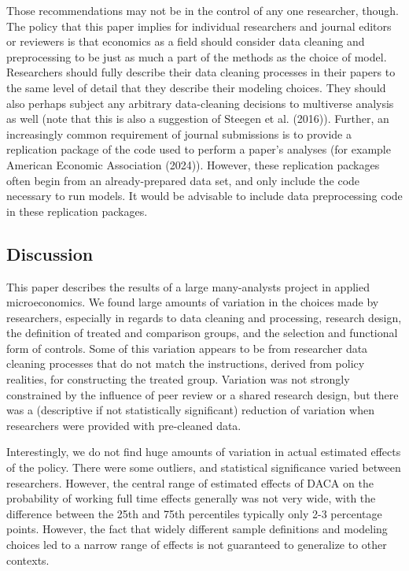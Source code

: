 \documentclass[
  letterpaper,
  DIV=11,
  numbers=noendperiod]{scrartcl}
\begin{document}
Those recommendations may not be in the control of any one researcher,
though. The policy that this paper implies for individual researchers
and journal editors or reviewers is that economics as a field should
consider data cleaning and preprocessing to be just as much a part of
the methods as the choice of model. Researchers should fully describe
their data cleaning processes in their papers to the same level of
detail that they describe their modeling choices. They should also
perhaps subject any arbitrary data-cleaning decisions to multiverse
analysis as well (note that this is also a suggestion of Steegen et al.
(2016)). Further, an increasingly common requirement of journal
submissions is to provide a replication package of the code used to
perform a paper's analyses (for example American Economic Association
(2024)). However, these replication packages often begin from an
already-prepared data set, and only include the code necessary to run
models. It would be advisable to include data preprocessing code in
these replication packages.

\subsection{Discussion}\label{discussion}

This paper describes the results of a large many-analysts project in
applied microeconomics. We found large amounts of variation in the
choices made by researchers, especially in regards to data cleaning and
processing, research design, the definition of treated and comparison
groups, and the selection and functional form of controls. Some of this
variation appears to be from researcher data cleaning processes that do
not match the instructions, derived from policy realities, for
constructing the treated group. Variation was not strongly constrained
by the influence of peer review or a shared research design, but there
was a (descriptive if not statistically significant) reduction of
variation when researchers were provided with pre-cleaned data.

Interestingly, we do not find huge amounts of variation in actual
estimated effects of the policy. There were some outliers, and
statistical significance varied between researchers. However, the
central range of estimated effects of DACA on the probability of working
full time effects generally was not very wide, with the difference
between the 25th and 75th percentiles typically only 2-3 percentage
points. However, the fact that widely different sample definitions and
modeling choices led to a narrow range of effects is not guaranteed to
generalize to other contexts.
\end{document}
